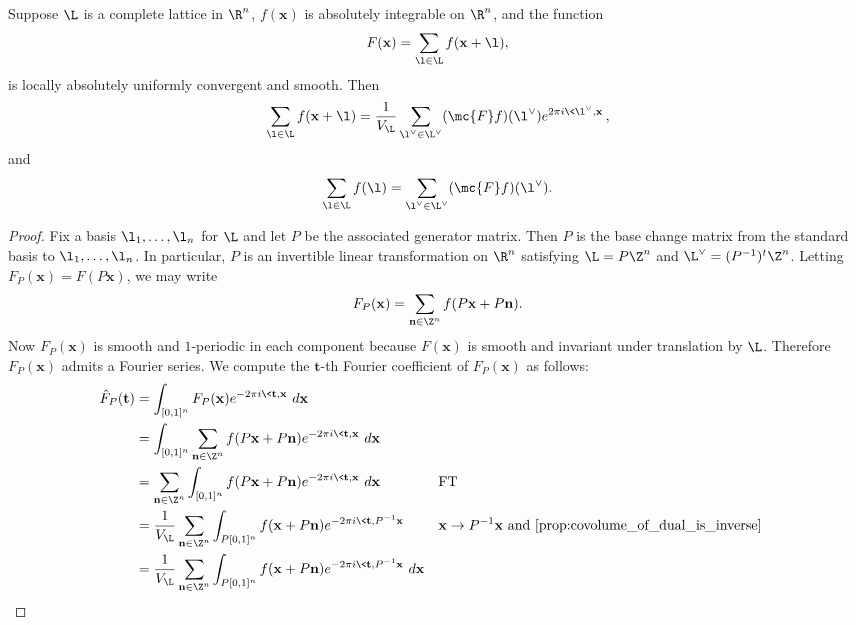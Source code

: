       \begin{theorem}
        Suppose $\L$ is a complete lattice in $\R^{n}$, $f(\mathbf{x})$ is absolutely integrable on $\R^{n}$, and the function
        \[
          F(\mathbf{x}) = \sum_{\l \in \L}f(\mathbf{x}+\l),
        \]
        is locally absolutely uniformly convergent and smooth. Then
        \[
          \sum_{\l \in \L}f(\mathbf{x}+\l) = \frac{1}{V_{\L}}\sum_{\l^{\vee} \in \L^{\vee}}(\mc{F}f)(\l^{\vee})e^{2\pi i\<\l^{\vee},\mathbf{x}\>},
        \]
        and
        \[
          \sum_{\l \in \L}f(\l) = \sum_{\l^{\vee} \in \L^{\vee}}(\mc{F}f)(\l^{\vee}).
        \]
      \end{theorem}
      \begin{proof}
        Fix a basis $\l_{1},\ldots,\l_{n}$ for $\L$ and let $P$ be the associated generator matrix. Then $P$ is the base change matrix from the standard basis to $\l_{1},\ldots,\l_{n}$. In particular, $P$ is an invertible linear transformation on $\R^{n}$ satisfying $\L = P\Z^{n}$ and $\L^{\vee} = (P^{-1})^{t}\Z^{n}$. Letting $ F_{P}(\mathbf{x}) = F(P\mathbf{x})$, we may write
        \[
          F_{P}(\mathbf{x}) = \sum_{\mathbf{n} \in \Z^{n}}f(P\mathbf{x}+P\mathbf{n}).
        \]
        Now $F_{P}(\mathbf{x})$ is smooth and $1$-periodic in each component because $F(\mathbf{x})$ is smooth and invariant under translation by $\L$. Therefore $F_{P}(\mathbf{x})$ admits a Fourier series. We compute the $\mathbf{t}$-th Fourier coefficient of $F_{P}(\mathbf{x})$ as follows:
        \begin{align*}
          \hat{F}_{P}(\mathbf{t}) &= \int_{[0,1]^{n}}F_{P}(\mathbf{x})e^{-2\pi i\<\mathbf{t},\mathbf{x}\>}\,d\mathbf{x} \\
          &= \int_{[0,1]^{n}}\sum_{\mathbf{n} \in \Z^{n}}f(P\mathbf{x}+P\mathbf{n})e^{-2\pi i\<\mathbf{t},\mathbf{x}\>}\,d\mathbf{x} \\
          &= \sum_{\mathbf{n} \in \Z^{n}}\int_{[0,1]^{n}}f(P\mathbf{x}+P\mathbf{n})e^{-2\pi i\<\mathbf{t},\mathbf{x}\>}\,d\mathbf{x} && \text{FT} \\
          &= \frac{1}{V_{\L}}\sum_{\mathbf{n} \in \Z^{n}}\int_{P[0,1]^{n}}f(\mathbf{x}+P\mathbf{n})e^{-2\pi i\<\mathbf{t},P^{-1}\mathbf{x}\>} && \text{$\mathbf{x} \to P^{-1}\mathbf{x}$ and \cref{prop:covolume_of_dual_is_inverse}} \\
          &= \frac{1}{V_{\L}}\sum_{\mathbf{n} \in \Z^{n}}\int_{P[0,1]^{n}}f(\mathbf{x}+P\mathbf{n})e^{-2\pi i\<\mathbf{t},P^{-1}\mathbf{x}\>}\,d\mathbf{x} \\

\end{align*}
\end{proof}
